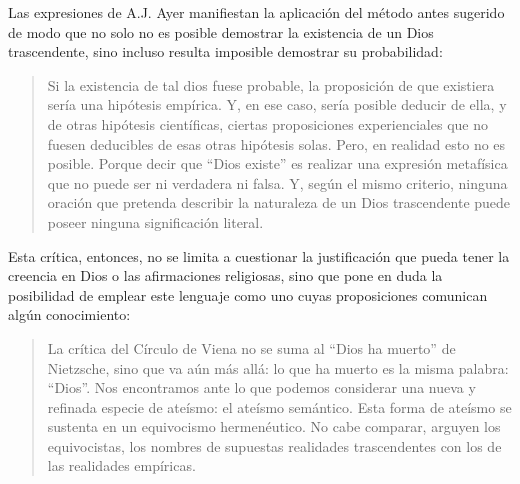 Las expresiones de A.J. Ayer manifiestan la aplicación del método antes sugerido de modo que no solo no es posible demostrar la existencia de un Dios trascendente, sino incluso resulta imposible demostrar su probabilidad: \blockquote[{\cite[Véase~][155]{dominguez2009at}}]{Si la existencia de tal dios fuese probable, la proposición de que existiera sería una hipótesis empírica. Y, en ese caso, sería posible deducir de ella, y de otras hipótesis científicas, ciertas proposiciones experienciales que no fuesen deducibles de esas otras hipótesis solas. Pero, en realidad esto no es posible. \textelp{} Porque decir que ``Dios existe'' es realizar una expresión metafísica que no puede ser ni verdadera ni falsa. Y, según el mismo criterio, ninguna oración que pretenda describir la naturaleza de un Dios trascendente puede poseer ninguna significación literal.} Esta crítica, entonces, no se limita a cuestionar la justificación que pueda tener la creencia en Dios o las afirmaciones religiosas, sino que pone en duda la posibilidad de emplear este lenguaje como uno cuyas proposiciones comunican algún conocimiento: \blockquote[{\cite[155]{dominguez2009at}}]{La crítica del Círculo de Viena no se suma al ``Dios ha muerto'' de Nietzsche, sino que va aún más allá: lo que ha muerto es la misma palabra: ``Dios''. Nos encontramos ante lo que podemos considerar una nueva y refinada especie de ateísmo: el ateísmo semántico. Esta forma de ateísmo se sustenta en un equivocismo hermenéutico. No cabe comparar, arguyen los equivocistas, los nombres de supuestas realidades trascendentes con los de las realidades empíricas.}

